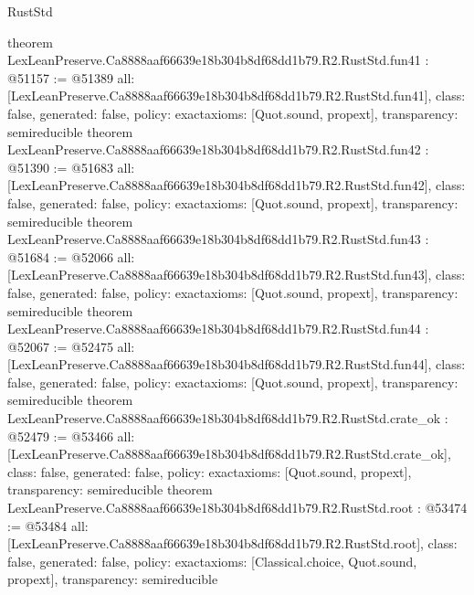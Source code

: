 \begin{lexlean}{RustStd}
\begin{coremodule}
{}
theorem LexLeanPreserve.Ca8888aaf66639e18b304b8df68dd1b79.R2.RustStd.fun41 : @51157 := @51389 {
  all: [LexLeanPreserve.Ca8888aaf66639e18b304b8df68dd1b79.R2.RustStd.fun41],
  class: false,
  generated: false,
  policy: exact{axioms: [Quot.sound, propext]},
  transparency: semireducible
}
theorem LexLeanPreserve.Ca8888aaf66639e18b304b8df68dd1b79.R2.RustStd.fun42 : @51390 := @51683 {
  all: [LexLeanPreserve.Ca8888aaf66639e18b304b8df68dd1b79.R2.RustStd.fun42],
  class: false,
  generated: false,
  policy: exact{axioms: [Quot.sound, propext]},
  transparency: semireducible
}
theorem LexLeanPreserve.Ca8888aaf66639e18b304b8df68dd1b79.R2.RustStd.fun43 : @51684 := @52066 {
  all: [LexLeanPreserve.Ca8888aaf66639e18b304b8df68dd1b79.R2.RustStd.fun43],
  class: false,
  generated: false,
  policy: exact{axioms: [Quot.sound, propext]},
  transparency: semireducible
}
theorem LexLeanPreserve.Ca8888aaf66639e18b304b8df68dd1b79.R2.RustStd.fun44 : @52067 := @52475 {
  all: [LexLeanPreserve.Ca8888aaf66639e18b304b8df68dd1b79.R2.RustStd.fun44],
  class: false,
  generated: false,
  policy: exact{axioms: [Quot.sound, propext]},
  transparency: semireducible
}
theorem LexLeanPreserve.Ca8888aaf66639e18b304b8df68dd1b79.R2.RustStd.crate_ok : @52479 := @53466 {
  all: [LexLeanPreserve.Ca8888aaf66639e18b304b8df68dd1b79.R2.RustStd.crate_ok],
  class: false,
  generated: false,
  policy: exact{axioms: [Quot.sound, propext]},
  transparency: semireducible
}
theorem LexLeanPreserve.Ca8888aaf66639e18b304b8df68dd1b79.R2.RustStd.root : @53474 := @53484 {
  all: [LexLeanPreserve.Ca8888aaf66639e18b304b8df68dd1b79.R2.RustStd.root],
  class: false,
  generated: false,
  policy: exact{axioms: [Classical.choice, Quot.sound, propext]},
  transparency: semireducible
}


\end{coremodule}
\end{lexlean}
